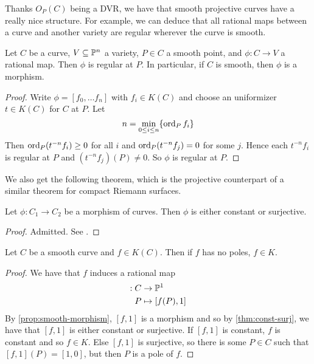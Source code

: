 Thanks $O_P(C)$ being a DVR, we have that smooth projective curves
have a really nice structure.
For example, we can deduce that all rational maps between a curve
and another variety are regular wherever the curve is smooth.

\begin{proposition}
	\label{prop:smooth-morphism}
	Let $C$ be a curve, $V \subseteq \mathbb{P}^n$ a variety,
	$P \in C$ a smooth point, and $\phi: C \to V$ a rational map.
	Then $\phi$ is regular at $P$. In particular, if $C$ is smooth, 
	then $\phi$ is a morphism.
\end{proposition}
\begin{proof}
	Write $\phi = [f_0, \dots f_n]$ with $f_i \in K(C)$
	and choose an uniformizer $t \in K(C)$ for $C$ at $P$.
	Let 
	\begin{equation*}
		n = \min_{0 \leq i \leq n}\{\operatorname{ord}_P f_i\}
	\end{equation*}
	Then $\operatorname{ord}_P(t^{-n}f_i) \geq 0$ for all $i$ and $\operatorname{ord}_P(t^{-n}f_j) = 0$
	for some $j$. Hence each $t^{-n}f_i$ is regular at $P$ and
	$(t^{-n}f_j)(P) \neq 0$. So $\phi$ is regular at $P$.
\end{proof}

We also get the following theorem, which is the projective counterpart of a
similar theorem for compact Riemann surfaces.

\begin{theorem}
	\label{thm:const-surj}
	Let $\phi: C_1 \to C_2$ be a morphism of curves. Then $\phi$ is either
	constant or surjective.
\end{theorem}
\begin{proof}
	Admitted. See \cite[II.6.8]{hartshorne}.
\end{proof}

\begin{corollary}
	\label{prop:curves-poles}
	Let $C$ be a smooth curve and $f \in K(C)$. Then if $f$ has no poles,
	$f \in K$.
\end{corollary}

\begin{proof}
	We have that $f$ induces a rational map
	\begin{align*}
		[f, 1]: C&\to \proj^1\\
		P &\mapsto [f(P), 1]
	\end{align*}
	By \ref{prop:smooth-morphism}, $[f, 1]$ is a morphism and
	so by \ref{thm:const-surj}, we have that $[f, 1]$ is either constant
	or surjective. If $[f, 1]$ is constant, $f$ is constant and so $f \in K$.
	Else $[f, 1]$ is surjective, so there is some $P \in C$ such that
	$[f, 1](P) = [1, 0]$, but then $P$ is a pole of $f$.
\end{proof}

